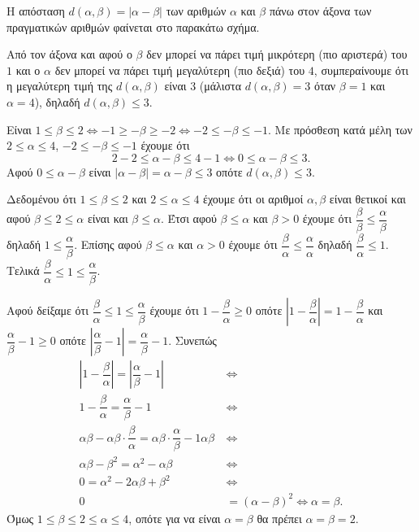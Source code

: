 
\begin{alist}
\item Η απόσταση $d(\alpha, \beta) = |\alpha - \beta|$ των αριθμών $\alpha$ και $\beta$ πάνω στον άξονα των πραγματικών αριθμών φαίνεται στο παρακάτω σχήμα.

\begin{rlist}
\item Από τον άξονα και αφού ο $\beta$ δεν μπορεί να πάρει τιμή μικρότερη (πιο αριστερά) του $1$ και ο $\alpha$ δεν μπορεί να πάρει τιμή μεγαλύτερη (πιο δεξιά) του $4$, συμπεραίνουμε ότι η μεγαλύτερη τιμή της $d(\alpha, \beta)$ είναι $3$ (μάλιστα $d(\alpha, \beta) = 3$ όταν $\beta = 1$ και $\alpha = 4$), δηλαδή $d(\alpha, \beta) \le 3$.
\item Είναι $1 \le \beta \le 2 \Leftrightarrow -1 \ge -\beta \ge -2 \Leftrightarrow -2 \le -\beta \le -1$.
Με πρόσθεση κατά μέλη των $2 \le \alpha \le 4$, $-2 \le -\beta \le -1$ έχουμε ότι
\[2 - 2 \le \alpha - \beta \le 4 - 1 \Leftrightarrow 0 \le \alpha - \beta \le 3.\]
Αφού $0 \le \alpha - \beta$ είναι $|\alpha - \beta| = \alpha - \beta \le 3$ οπότε $d(\alpha, \beta) \le 3$.
\end{rlist}

\item 
\begin{rlist}
\item Δεδομένου ότι $1 \le \beta \le 2$ και $2 \le \alpha \le 4$ έχουμε ότι οι αριθμοί $\alpha, \beta$ είναι θετικοί και αφού $\beta \le 2 \le \alpha$ είναι και $\beta \le \alpha$.
Έτσι αφού $\beta \le \alpha$ και $\beta > 0$ έχουμε ότι $\dfrac{\beta}{\beta} \le \dfrac{\alpha}{\beta}$ δηλαδή $1 \le \dfrac{\alpha}{\beta}$.
Επίσης αφού $\beta \le \alpha$ και $\alpha > 0$ έχουμε ότι $\dfrac{\beta}{\alpha} \le \dfrac{\alpha}{\alpha}$ δηλαδή $\dfrac{\beta}{\alpha} \le 1$.
Τελικά $\dfrac{\beta}{\alpha} \le 1 \le \dfrac{\alpha}{\beta}$.
\item Αφού δείξαμε ότι $\dfrac{\beta}{\alpha} \le 1 \le \dfrac{\alpha}{\beta}$ έχουμε ότι $1 - \dfrac{\beta}{\alpha} \ge 0$ οπότε $\left|1 - \dfrac{\beta}{\alpha}\right| = 1 - \dfrac{\beta}{\alpha}$ και
$\dfrac{\alpha}{\beta} - 1 \ge 0$ οπότε $\left|\dfrac{\alpha}{\beta} - 1\right| = \dfrac{\alpha}{\beta} - 1$.
Συνεπώς
\begin{align*}
\left|1 - \dfrac{\beta}{\alpha}\right| = \left|\dfrac{\alpha}{\beta} - 1\right| \ &\Leftrightarrow \\
1 - \dfrac{\beta}{\alpha} = \dfrac{\alpha}{\beta} - 1 \ &\Leftrightarrow \\
\alpha\beta - \alpha\beta \cdot \dfrac{\beta}{\alpha} = \alpha\beta \cdot \dfrac{\alpha}{\beta} - 1\alpha\beta \ &\Leftrightarrow \\
\alpha\beta - \beta^2 = \alpha^2 - \alpha\beta \ &\Leftrightarrow \\
0 = \alpha^2 - 2\alpha\beta + \beta^2 \ &\Leftrightarrow \\
0 &= (\alpha - \beta)^2 \Leftrightarrow \alpha = \beta.
\end{align*}
Όμως $1 \le \beta \le 2 \le \alpha \le 4$, οπότε για να είναι $\alpha = \beta$ θα πρέπει $\alpha = \beta = 2$.
\end{rlist}
\end{alist}


